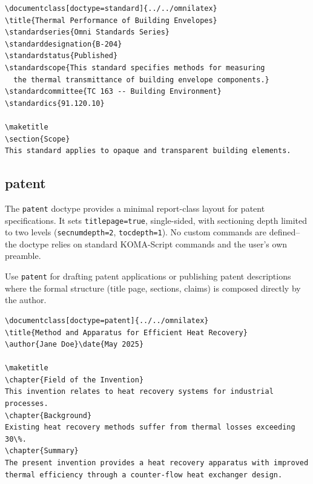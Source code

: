 \begin{verbatim}
\documentclass[doctype=standard]{../../omnilatex}
\title{Thermal Performance of Building Envelopes}
\standardseries{Omni Standards Series}
\standarddesignation{B-204}
\standardstatus{Published}
\standardscope{This standard specifies methods for measuring
  the thermal transmittance of building envelope components.}
\standardcommittee{TC 163 -- Building Environment}
\standardics{91.120.10}

\maketitle
\section{Scope}
This standard applies to opaque and transparent building elements.

\end{verbatim}

\subsection{patent}

The \texttt{patent} doctype provides a minimal report-class layout for patent
specifications.  It sets \texttt{titlepage=true}, single-sided, with
sectioning depth limited to two levels (\texttt{secnumdepth=2},
\texttt{tocdepth=1}).  No custom commands are defined--the doctype relies
on standard KOMA-Script commands and the user's own preamble.

Use \texttt{patent} for drafting patent applications or publishing patent
descriptions where the formal structure (title page, sections, claims) is
composed directly by the author.

\begin{verbatim}
\documentclass[doctype=patent]{../../omnilatex}
\title{Method and Apparatus for Efficient Heat Recovery}
\author{Jane Doe}\date{May 2025}

\maketitle
\chapter{Field of the Invention}
This invention relates to heat recovery systems for industrial processes.
\chapter{Background}
Existing heat recovery methods suffer from thermal losses exceeding 30\%.
\chapter{Summary}
The present invention provides a heat recovery apparatus with improved
thermal efficiency through a counter-flow heat exchanger design.

\end{verbatim}

